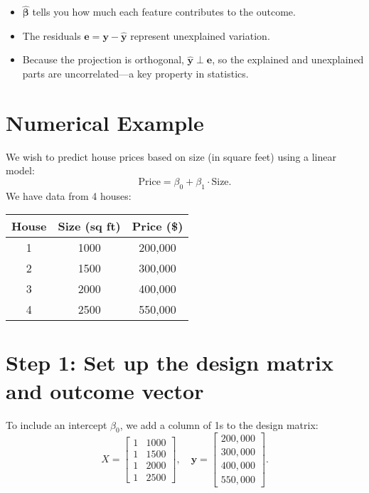 \documentclass{article}
\begin{document}
\begin{itemize}
\item $\hat{\boldsymbol{\beta}}$ tells you how much each feature contributes to the outcome.
    \item The residuals $\mathbf{e} = \mathbf{y} - \hat{\mathbf{y}}$ represent unexplained variation.
    \item Because the projection is orthogonal, $\hat{\mathbf{y}} \perp \mathbf{e}$, so the explained and unexplained parts are uncorrelated—a key property in statistics.
\end{itemize}


\section*{Numerical Example}
We wish to predict house prices based on size (in square feet) using a linear model:
\[
\text{Price} = \beta_0 + \beta_1 \cdot \text{Size}.
\]
We have data from 4 houses:

\begin{center}
\begin{tabular}{ccc}
\toprule
House & Size (sq ft) & Price (\$) \\
\midrule
1 & 1000 & 200{,}000 \\
2 & 1500 & 300{,}000 \\
3 & 2000 & 400{,}000 \\
4 & 2500 & 550{,}000 \\
\bottomrule
\end{tabular}
\end{center}

\section*{Step 1: Set up the design matrix and outcome vector}

To include an intercept $\beta_0$, we add a column of 1s to the design matrix:
\[
X = \begin{bmatrix}
1 & 1000 \\
1 & 1500 \\
1 & 2000 \\
1 & 2500
\end{bmatrix},
\quad
\mathbf{y} = \begin{bmatrix}
200{,}000 \\
300{,}000 \\
400{,}000 \\
550{,}000
\end{bmatrix}.
\]
\end{document}
